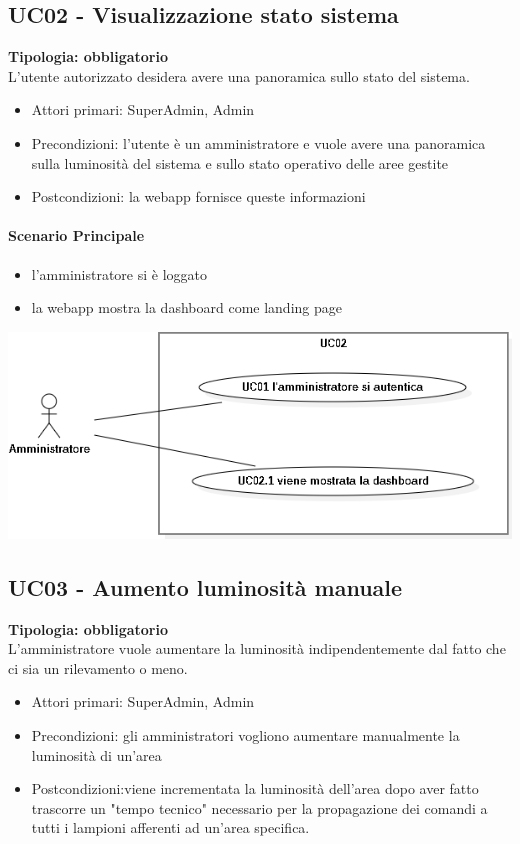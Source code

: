\documentclass[12pt]{article}
\begin{document}
\subsection{UC02 - Visualizzazione stato sistema}
\textbf{Tipologia: obbligatorio} \\
L'utente autorizzato desidera avere una panoramica sullo stato del sistema.
\begin{itemize}
	\item Attori primari: SuperAdmin, Admin
	\item Precondizioni: l'utente è un amministratore e vuole avere una panoramica sulla luminosità del sistema e sullo stato operativo delle aree gestite
	\item Postcondizioni: la webapp fornisce queste informazioni
\end{itemize}
\paragraph{Scenario Principale}
\begin{itemize}
	\item l'amministratore si è loggato
	\item la webapp mostra la dashboard come landing page
\end{itemize}

\includegraphics[scale=0.5]{UC02.png}

\subsection{UC03 - Aumento luminosità manuale}
\textbf{Tipologia: obbligatorio} \\
L'amministratore vuole aumentare la luminosità indipendentemente dal fatto che ci sia un rilevamento o meno.
\begin{itemize}
	\item Attori primari: SuperAdmin, Admin
	\item Precondizioni: gli amministratori vogliono aumentare manualmente la luminosità di un'area
	\item Postcondizioni:viene incrementata la luminosità dell'area dopo aver fatto trascorre un "tempo tecnico" necessario per la propagazione dei comandi a tutti i lampioni afferenti ad un'area specifica.
\end{itemize}
\end{document}

